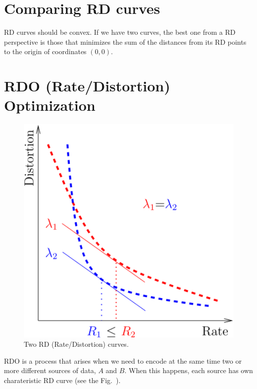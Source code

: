 \section{Comparing RD curves}
RD curves should be convex. If we have two curves, the best one from a
RD perspective is those that minimizes the sum of the distances from
its RD points to the origin of coordinates $(0,0)$.

\section{RDO (Rate/Distortion) Optimization}

\begin{figure}
  \centering
  \includegraphics[width=1.0\textwidth]{graphics/RD_slopes} 
  \caption{Two RD (Rate/Distortion) curves.}
  \label{fig:RD_slopes}
\end{figure}

RDO is a process that arises when we need to encode at the same time
two or more different sources of data, $A$ and $B$. When this happens,
each source has own charateristic RD curve (see the
Fig.~\cite{RD_slopes}).

